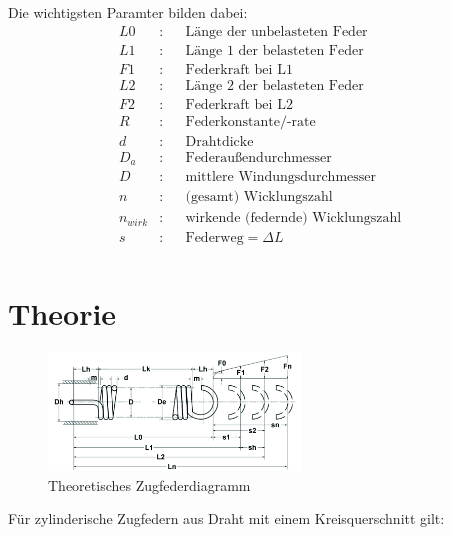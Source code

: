     Die wichtigsten Paramter bilden dabei:
    \begin{align*}
        L0 &:& &\text{Länge der unbelasteten Feder}\\
        L1 &:& &\text{Länge 1 der belasteten Feder}\\
        F1 &:& &\text{Federkraft bei L1}\\
        L2 &:& &\text{Länge 2 der belasteten Feder}\\
        F2 &:& &\text{Federkraft bei L2}\\
        R &:& &\text{Federkonstante/-rate}\\
        d &:& &\text{Drahtdicke}\\
        D_a &:& &\text{Federaußendurchmesser}\\
        D &:& &\text{mittlere Windungsdurchmesser}\\
        n &:& &\text{(gesamt) Wicklungszahl}\\
        n_{wirk}&:& &\text{wirkende (federnde) Wicklungszahl}\\
        s &:& &\text{Federweg}=\Delta L \\
    \end{align*}
\label{sec:praxis}























\newpage
\section{Theorie}
\begin{figure}[H]
    \centering
    \includegraphics[width=0.6\textwidth]{bilder/Input/Zugfeder_technisch.jpg}
    \caption{Theoretisches Zugfederdiagramm \cite{AusM2}}
\end{figure}
Für zylinderische Zugfedern aus Draht mit einem Kreisquerschnitt gilt:\\\\

